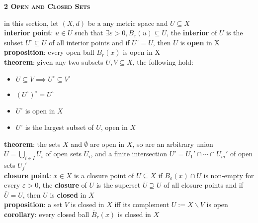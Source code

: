 \documentclass[a4paper]{article}
\newcommand*\closure[1]{\overline{#1}}
\newcommand*\interior[1]{{#1}^\circ}
\begin{document}
\begin{framed}
	\begin{center}
		\textbf{\textsc{2 Open and Closed Sets}}
	\end{center}
	in this section, let $(X, d)$ be a any metric space and $U \subseteq X$\\
	
	\noindent
	\textbf{interior point}: $u \in U$ such that $\exists \varepsilon > 0, B_\varepsilon(u) \subseteq U$, the \textbf{interior} of $U$ is the subset $\interior{U} \subseteq U$ of all interior points and if $\interior{U} = U$, then $U$ is \textbf{open} in X\\
	
	\noindent
	\textbf{proposition}: every open ball $B_r(x)$ is open in X\\
	
	\noindent
	\textbf{theorem}: given any two subsets $U, V \subseteq X$, the following hold:
	\begin{multicols}{2}
		\begin{itemize}
			\item $U \subseteq V \implies \interior{U} \subseteq \interior{V}$
			\item $\interior{(\interior{U})} = \interior{U}$
			\item $\interior{U}$ is open in $X$
			\item $\interior{U}$ is the largest subset of $U$, open in $X$
		\end{itemize}	
	\end{multicols}
	
	\noindent
	\textbf{theorem}: the sets $X$ and $\emptyset$ are open in $X$, so are an arbitrary union $U = \bigcup_{i \in I} U_i$ of open sets $U_i$, and a finite intersection $U' = U_1' \cap \cdots \cap U_m'$ of open sets $U_j'$\\
	
	\noindent
	\textbf{closure point}: $x \in X$ is a closure point of $U \subseteq X$ if $B_\varepsilon(x) \cap U$ is non-empty for every $\varepsilon > 0$, the \textbf{closure} of $U$ is the superset $\closure{U} \supseteq U$ of all closure points and if $\closure{U} = U$, then $U$ is \textbf{closed} in $X$\\
	
	\noindent
	\textbf{proposition}: a set $V$ is closed in $X$ iff its complement $U := X \backslash V$ is open\\
	
	\noindent
	\textbf{corollary}: every closed ball $\closure{B}_r(x)$ is closed in $X$\\
	

\end{framed}
\end{document}
